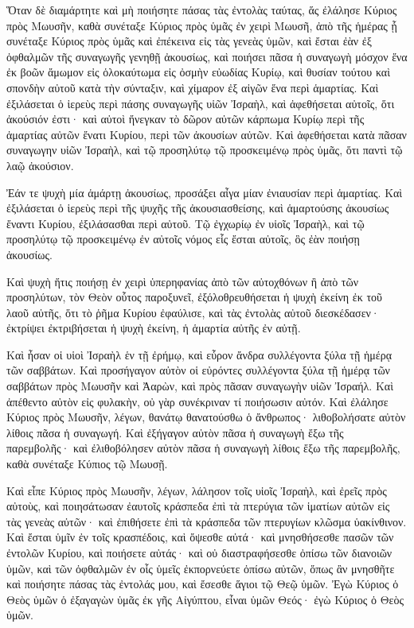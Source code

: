 {\par }{\PP {}Ὅταν δὲ διαμάρτητε καὶ μὴ ποιήσητε πάσας τὰς ἐντολὰς ταύτας, ἅς ἐλάλησε Κύριος πρὸς Μωυσῆν,
καθὰ συνέταξε Κύριος πρὸς ὑμᾶς ἐν χειρὶ Μωυσῆ, ἀπὸ τῆς ἡμέρας ᾗ συνέταξε Κύριος πρὸς ὑμᾶς καὶ ἐπέκεινα εἰς τὰς γενεὰς ὑμῶν,
καὶ ἔσται ἐὰν ἐξ ὀφθαλμῶν τῆς συναγωγῆς γενηθῇ ἀκουσίως, καὶ ποιήσει πᾶσα ἡ συναγωγὴ μόσχον ἕνα ἐκ βοῶν ἄμωμον εἰς ὁλοκαύτωμα εἰς ὀσμὴν εὐωδίας Κυρίῳ, καὶ θυσίαν τούτου καὶ σπονδὴν αὐτοῦ κατὰ τὴν σύνταξιν, καὶ χίμαρον ἐξ αἰγῶν ἕνα περὶ ἁμαρτίας.
Καὶ ἐξιλάσεται ὁ ἱερεὺς περὶ πάσης συναγωγῆς υἱῶν Ἰσραὴλ, καὶ ἀφεθήσεται αὐτοῖς, ὅτι ἀκούσιόν ἐστι· καὶ αὐτοὶ ἤνεγκαν τὸ δῶρον αὐτῶν κάρπωμα Κυρίῳ περὶ τῆς ἁμαρτίας αὐτῶν ἔνατι Κυρίου, περὶ τῶν ἀκουσίων αὐτῶν.
Καὶ ἀφεθήσεται κατὰ πᾶσαν συναγωγην υἱῶν Ἰσραὴλ, καὶ τῷ προσηλύτῳ τῷ προσκειμένῳ πρὸς ὑμᾶς, ὅτι παντὶ τῷ λαῷ ἀκούσιον.
\par }{\PP {}Ἐάν τε ψυχὴ μία ἁμάρτῃ ἀκουσίως, προσάξει αἶγα μίαν ἐνιαυσίαν περὶ ἁμαρτίας.
Καὶ ἐξιλάσεται ὁ ἱερεὺς περὶ τῆς ψυχῆς τῆς ἀκουσιασθείσης, καὶ ἁμαρτούσης ἀκουσίως ἔναντι Κυρίου, ἐξιλάσασθαι περὶ αὐτοῦ.
Τῷ ἐγχωρίῳ ἐν υἱοῖς Ἰσραὴλ, καὶ τῷ προσηλύτῳ τῷ προσκειμένῳ ἐν αὐτοῖς νόμος εἷς ἔσται αὐτοῖς, ὃς ἐὰν ποιήσῃ ἀκουσίως.
\par }{\PP {}Καὶ ψυχὴ ἥτις ποιήσῃ ἐν χειρὶ ὑπερηφανίας ἀπὸ τῶν αὐτοχθόνων ἢ ἀπὸ τῶν προσηλύτων, τὸν Θεὸν οὗτος παροξυνεῖ, ἐξόλοθρευθήσεται ἡ ψυχὴ ἐκείνη ἐκ τοῦ λαοῦ αὐτῆς,
ὅτι τὸ ῥῆμα Κυρίου ἐφαύλισε, καὶ τὰς ἐντολὰς αὐτοῦ διεσκέδασεν· ἐκτρίψει ἐκτριβήσεται ἡ ψυχὴ ἐκείνη, ἡ ἁμαρτία αὐτῆς ἐν αὐτῇ.
\par }{\PP {}Καὶ ἦσαν οἱ υἱοὶ Ἰσραὴλ ἑν τῇ ἐρήμῳ, καὶ εὗρον ἄνδρα συλλέγοντα ξύλα τῇ ἡμέρᾳ τῶν σαββάτων.
Καὶ προσήγαγον αὐτὸν οἱ εὐρόντες συλλέγοντα ξύλα τῇ ἡμέρᾳ τῶν σαββάτων πρὸς Μωυσῆν καὶ Ἀαρὼν, καὶ πρὸς πᾶσαν συναγωγὴν υἱῶν Ἰσραήλ.
Καὶ ἀπέθεντο αὐτὸν εἰς φυλακὴν, οὐ γὰρ συνέκριναν τί ποιήσωσιν αὐτόν.
Καὶ ἐλάλησε Κύριος πρὸς Μωυσῆν, λέγων, θανάτῳ θανατούσθω ὁ ἄνθρωπος· λιθοβολήσατε αὐτὸν λίθοις πᾶσα ἡ συναγωγή.
Καὶ ἐξήγαγον αὐτὸν πᾶσα ἡ συναγωγὴ ἔξω τῆς παρεμβολῆς· καὶ ἐλιθοβόλησεν αὐτὸν πᾶσα ἡ συναγωγὴ λίθοις ἔξω τῆς παρεμβολῆς, καθὰ συνέταξε Κύπιος τῷ Μωυσῇ.
\par }{\PP {}Καὶ εἶπε Κύριος πρὸς Μωυσῆν, λέγων,
λάλησον τοῖς υἱοῖς Ἰσραὴλ, καὶ ἐρεῖς πρὸς αὐτοὺς, καὶ ποιησάτωσαν ἐαυτοῖς κράσπεδα ἐπὶ τὰ πτερύγια τῶν ἱματίων αὐτῶν εἰς τὰς γενεὰς αὐτῶν· καὶ ἐπιθήσετε ἐπὶ τὰ κράσπεδα τῶν πτερυγίων κλῶσμα ὑακίνθινον.
Καὶ ἔσται ὑμῖν ἐν τοῖς κρασπέδοις, καὶ ὄψεσθε αὐτά· καὶ μνησθήσεσθε πασῶν τῶν ἐντολῶν Κυρίου, καὶ ποιήσετε αὐτάς· καὶ οὐ διαστραφήσεσθε ὀπίσω τῶν διανοιῶν ὑμῶν, καὶ τῶν ὀφθαλμῶν ἐν οἷς ὑμεῖς ἐκπορνεύετε ὀπίσω αὐτῶν, ὅπως ἂν μνησθῆτε καὶ ποιήσητε πάσας τὰς ἐντολάς μου,
καὶ ἔσεσθε ἅγιοι τῷ Θεῷ ὑμῶν.
Ἐγὼ Κύριος ὁ Θεὸς ὑμῶν ὁ ἐξαγαγὼν ὑμᾶς ἐκ γῆς Αἰγύπτου, εἶναι ὑμῶν Θεός· ἐγὼ Κύριος ὁ Θεὸς ὑμῶν.

}
